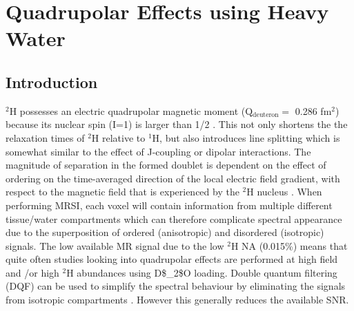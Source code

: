 \chapter{Quadrupolar Effects using Heavy Water}
\label{Chap:Quad}

\section{Introduction}

$^2$H possesses an electric quadrupolar magnetic moment (Q$_{\text{deuteron}}=$ 0.286 fm$^2$)  because its nuclear spin (I=1) is larger than 1/2 \cite{Stone2015NuclearData}. This not only shortens the the relaxation times of $^2$H relative to $^1$H, but also introduces line splitting which is somewhat similar to the effect of J-coupling or dipolar interactions. The magnitude of separation in the formed doublet is dependent on the effect of ordering on the time-averaged direction of the local electric field gradient, with respect to the magnetic field that is experienced by the $^2$H nucleus \cite{Seelig1977DeuteriumMembranes, Eliav2016MultipleMRS}. When performing \ac{MRSI}, each voxel will contain information from multiple different tissue/water compartments which can therefore complicate spectral appearance due to the superposition of ordered (anisotropic) and disordered (isotropic) signals. The low available MR signal due to the low $^2$H \ac{NA} (0.015\%) means that quite often studies looking into quadrupolar effects are performed at high field  \cite{Gursan2022ResidualMuscle} and \cite{Ooms2015DoubleTissue}/or \cite{Damion2022DoubleLoading} high $^2$H abundances using \ac{D$_2$O} loading. Double quantum filtering (DQF) can be used to simplify the spectral behaviour by eliminating the signals from isotropic compartments \cite{Sharf1995DetectionNMR-Spectroscopy, Perea20072HDisc}. However this generally reduces the available \ac{SNR}. 

